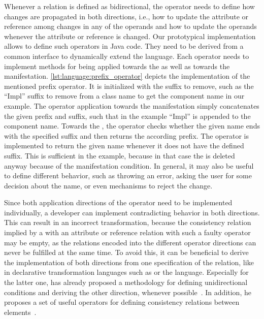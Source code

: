 Whenever a relation is defined as bidirectional, the operator needs to define how changes are propagated in both directions, i.e., how to update the \commonality attribute or reference among changes in any of the operands and how to update the operands whenever the \commonality attribute or reference is changed.
Our prototypical implementation allows to define such operators in Java code.
They need to be derived from a common interface to dynamically extend the language.
Each operator needs to implement methods for being applied towards the \commonality as well as towards the manifestation.
\autoref{lst:language:prefix_operator} depicts the implementation of the mentioned prefix operator.
It is initialized with the suffix to remove, such as the \enquote{Impl} suffix to remove from a class name to get the component name in our example.
The operator application towards the manifestation simply concatenates the given prefix and suffix, such that in the example \enquote{Impl} is appended to the component name.
Towards the \commonality, the operator checks whether the given name ends with the specified suffix and then returns the according prefix.
The operator is implemented to return the given name whenever it does not have the defined suffix.
This is sufficient in the example, because in that case the \commonality is deleted anyway because of the manifestation condition.
In general, it may also be useful to define different behavior, such as throwing an error, asking the user for some decision about the name, or even mechanisms to reject the change.

Since both application directions of the operator need to be implemented individually, a developer can implement contradicting behavior in both directions.
This can result in an incorrect transformation, because the consistency relation implied by a \commonality with an attribute or reference relation with such a faulty operator may be empty, as the relations encoded into the different operator directions can never be fulfilled at the same time.
To avoid this, it can be beneficial to derive the implementation of both directions from one specification of the relation, like in declarative transformation languages such as \qvtr or the \mappings language.
Especially for the latter one, \citeauthor{kramer2017a} has already proposed a methodology for defining unidirectional conditions and deriving the other direction, whenever possible~\cite[Sec.~7.4]{kramer2017a}.
In addition, he proposes a set of useful operators for defining consistency relations between elements~\cite[Sec.~7.3]{kramer2017a}.

